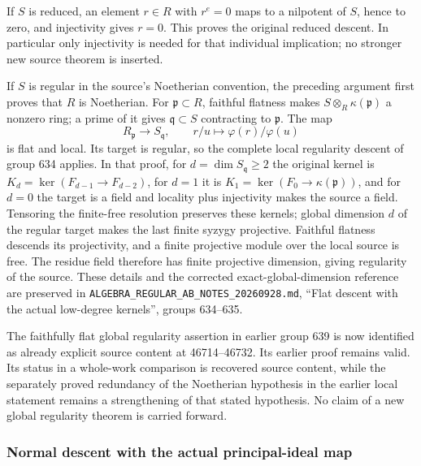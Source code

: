 If \(S\) is reduced, an element \(r\in R\) with \(r^e=0\) maps to a nilpotent of \(S\), hence to zero, and injectivity gives \(r=0\). This proves the original reduced descent. In particular only injectivity is needed for that individual implication; no stronger new source theorem is inserted.

If \(S\) is regular in the source's Noetherian convention, the preceding argument first proves that \(R\) is Noetherian. For \(\mathfrak p\subset R\), faithful flatness makes \(S\otimes_R\kappa(\mathfrak p)\) a nonzero ring; a prime of it gives \(\mathfrak q\subset S\) contracting to \(\mathfrak p\). The map \[
 R_{\mathfrak p}\longrightarrow S_{\mathfrak q},\qquad
 r/u\longmapsto\varphi(r)/\varphi(u)
\] is flat and local. Its target is regular, so the complete local regularity descent of group 634 applies. In that proof, for \(d=\dim S_{\mathfrak q}\ge2\) the original kernel is \(K_d=\ker(F_{d-1}\to F_{d-2})\), for \(d=1\) it is \(K_1=\ker(F_0\to\kappa(\mathfrak p))\), and for \(d=0\) the target is a field and locality plus injectivity makes the source a field. Tensoring the finite-free resolution preserves these kernels; global dimension \(d\) of the regular target makes the last finite syzygy projective. Faithful flatness descends its projectivity, and a finite projective module over the local source is free. The residue field therefore has finite projective dimension, giving regularity of the source. These details and the corrected exact-global-dimension reference are preserved in \texttt{ALGEBRA\_\allowbreak{}REGULAR\_\allowbreak{}AB\_\allowbreak{}NOTES\_\allowbreak{}20260928.\allowbreak{}md}, ``Flat descent with the actual low-degree kernels'', groups 634--635.

The faithfully flat global regularity assertion in earlier group 639 is now identified as already explicit source content at 46714--46732. Its earlier proof remains valid. Its status in a whole-work comparison is recovered source content, while the separately proved redundancy of the Noetherian hypothesis in the earlier local statement remains a strengthening of that stated hypothesis. No claim of a new global regularity theorem is carried forward.

\subsubsection{Normal descent with the actual principal-ideal map}\label{algebra-proof-069-normal-descent-with-the-actual-principal-ideal-map}

